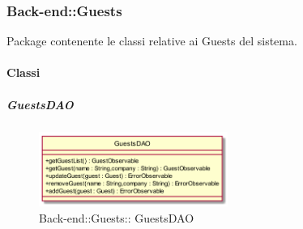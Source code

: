\subsubsection{Back-end::Guests}
Package contenente le classi relative ai Guests del sistema.
\paragraph{Classi}
\hypertarget{ GuestsDAO_label}{\subparagraph{ GuestsDAO}}
\begin{figure}[h]
	\centering
	\includegraphics[width=0.55\textwidth,height=\textheight,keepaspectratio]{images/ClassGuestsDAO.png}
	\caption{Back-end::Guests:: GuestsDAO}
\end{figure}
